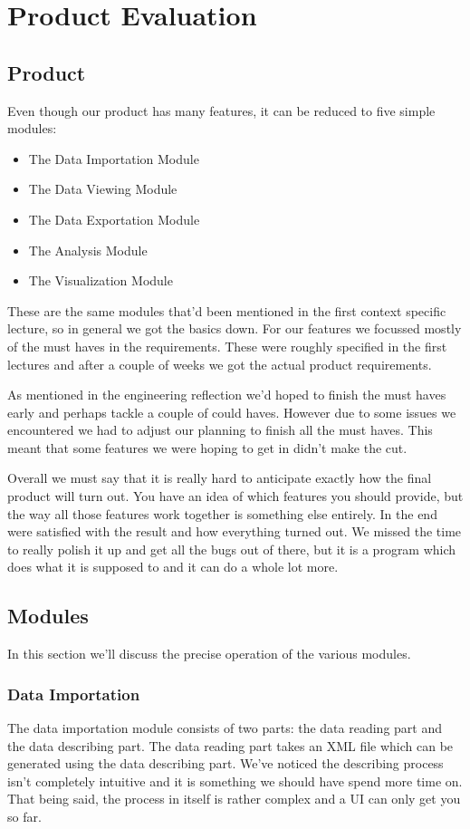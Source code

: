 \chapter{Product Evaluation} %

\section{Product}
Even though our product has many features, it can be reduced to five simple modules:
\begin{itemize}
	\item The Data Importation Module
	\item The Data Viewing Module
	\item The Data Exportation Module
	\item The Analysis Module
	\item The Visualization Module
\end{itemize}
These are the same modules that'd been mentioned in the first context specific lecture, so in general we got the basics down. For our features we focussed mostly of the must haves in the requirements. These were roughly specified in the first lectures and after a couple of weeks we got the actual product requirements.

As mentioned in the engineering reflection we'd hoped to finish the must haves early and perhaps tackle a couple of could haves. However due to some issues we encountered we had to adjust our planning to finish all the must haves. This meant that some features we were hoping to get in didn't make the cut.

Overall we must say that it is really hard to anticipate exactly how the final product will turn out. You have an idea of which features you should provide, but the way all those features work together is something else entirely. In the end were satisfied with the result and how everything turned out. We missed the time to really polish it up and get all the bugs out of there, but it is a program which does what it is supposed to and it can do a whole lot more.

\section{Modules}
In this section we'll discuss the precise operation of the various modules.

\subsection{Data Importation}
The data importation module consists of two parts: the data reading part and the data describing part. The data reading part takes an XML file which can be generated using the data describing part. We've noticed the describing process isn't completely intuitive and it is something we should have spend more time on. That being said, the process in itself is rather complex and a UI can only get you so far.

